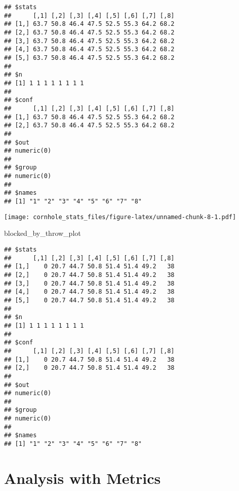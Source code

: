 \documentclass[
]{article}
\newenvironment{Shaded}{\begin{snugshade}}{\end{snugshade}}
\newcommand{\AttributeTok}[1]{\textcolor[rgb]{0.77,0.63,0.00}{#1}}
\newcommand{\FunctionTok}[1]{\textcolor[rgb]{0.00,0.00,0.00}{#1}}
\newcommand{\NormalTok}[1]{#1}
\newcommand{\OtherTok}[1]{\textcolor[rgb]{0.56,0.35,0.01}{#1}}
\newcommand{\SpecialCharTok}[1]{\textcolor[rgb]{0.00,0.00,0.00}{#1}}
\newcommand{\StringTok}[1]{\textcolor[rgb]{0.31,0.60,0.02}{#1}}
\begin{document}
\begin{verbatim}
## $stats
##      [,1] [,2] [,3] [,4] [,5] [,6] [,7] [,8]
## [1,] 63.7 50.8 46.4 47.5 52.5 55.3 64.2 68.2
## [2,] 63.7 50.8 46.4 47.5 52.5 55.3 64.2 68.2
## [3,] 63.7 50.8 46.4 47.5 52.5 55.3 64.2 68.2
## [4,] 63.7 50.8 46.4 47.5 52.5 55.3 64.2 68.2
## [5,] 63.7 50.8 46.4 47.5 52.5 55.3 64.2 68.2
## 
## $n
## [1] 1 1 1 1 1 1 1 1
## 
## $conf
##      [,1] [,2] [,3] [,4] [,5] [,6] [,7] [,8]
## [1,] 63.7 50.8 46.4 47.5 52.5 55.3 64.2 68.2
## [2,] 63.7 50.8 46.4 47.5 52.5 55.3 64.2 68.2
## 
## $out
## numeric(0)
## 
## $group
## numeric(0)
## 
## $names
## [1] "1" "2" "3" "4" "5" "6" "7" "8"
\end{verbatim}

\begin{Shaded}
\end{Shaded}

\texttt{[image: cornhole\_stats\_files/figure-latex/unnamed-chunk-8-1.pdf]}

\begin{Shaded}
\begin{Highlighting}[]
\NormalTok{blocked\_by\_throw\_plot}
\end{Highlighting}
\end{Shaded}

\begin{verbatim}
## $stats
##      [,1] [,2] [,3] [,4] [,5] [,6] [,7] [,8]
## [1,]    0 20.7 44.7 50.8 51.4 51.4 49.2   38
## [2,]    0 20.7 44.7 50.8 51.4 51.4 49.2   38
## [3,]    0 20.7 44.7 50.8 51.4 51.4 49.2   38
## [4,]    0 20.7 44.7 50.8 51.4 51.4 49.2   38
## [5,]    0 20.7 44.7 50.8 51.4 51.4 49.2   38
## 
## $n
## [1] 1 1 1 1 1 1 1 1
## 
## $conf
##      [,1] [,2] [,3] [,4] [,5] [,6] [,7] [,8]
## [1,]    0 20.7 44.7 50.8 51.4 51.4 49.2   38
## [2,]    0 20.7 44.7 50.8 51.4 51.4 49.2   38
## 
## $out
## numeric(0)
## 
## $group
## numeric(0)
## 
## $names
## [1] "1" "2" "3" "4" "5" "6" "7" "8"
\end{verbatim}

\hypertarget{analysis-with-metrics}{%
\section{Analysis with Metrics}\label{analysis-with-metrics}}
\end{document}
